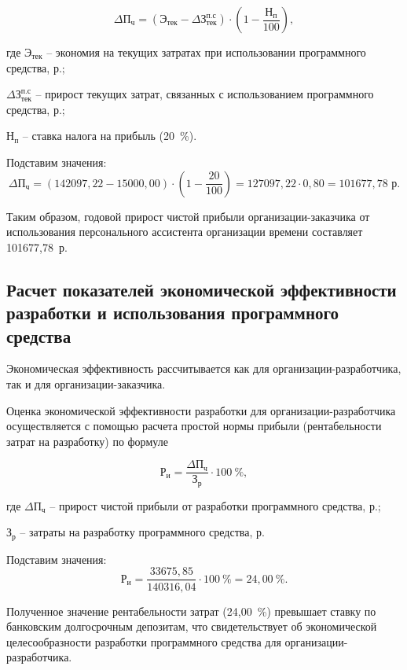 \begin{equation}
    \Delta\text{П}_{\text{ч}} = (\text{Э}_{\text{тек}} - \Delta\text{З}_{\text{тек}}^{\text{п.с}}) \cdot \left(1 - \frac{\text{Н}_{\text{п}}}{100}\right),
\end{equation}

где $\text{Э}_{\text{тек}}$ -- экономия на текущих затратах при использовании программного средства, р.;

    $\Delta\text{З}_{\text{тек}}^{\text{п.с}}$ -- прирост текущих затрат, связанных с использованием программного средства, р.;

    $\text{Н}_{\text{п}}$ -- ставка налога на прибыль (20~\%).

Подставим значения:
$$
    \Delta\text{П}_{\text{ч}} = (142097{,}22 - 15000{,}00) \cdot \left(1 - \frac{20}{100}\right) = 127097{,}22 \cdot 0{,}80 = 101677{,}78 \text{ р}.
$$

Таким образом, годовой прирост чистой прибыли организации-заказчика от использования персонального ассистента организации времени составляет 101677{,}78~р.

\subsection{Расчет показателей экономической эффективности разработки и использования программного средства}

Экономическая эффективность рассчитывается как для организации-разработчика, так и для организации-заказчика.

\numberedparagraph
Оценка экономической эффективности разработки для организации-разработчика осуществляется с помощью расчета простой нормы прибыли (рентабельности затрат на разработку) по формуле

\begin{equation}
    \text{Р}_{\text{и}} = \frac{\Delta\text{П}_{\text{ч}}}{\text{З}_{\text{р}}} \cdot 100~\%,
\end{equation}

где $\Delta\text{П}_{\text{ч}}$ -- прирост чистой прибыли от разработки программного средства, р.;

    $\text{З}_{\text{р}}$ -- затраты на разработку программного средства, р.

Подставим значения:
$$
    \text{Р}_{\text{и}} = \frac{33675{,}85}{140316{,}04} \cdot 100~\% = 24{,}00~\%.
$$

Полученное значение рентабельности затрат (24{,}00~\%) превышает ставку по банковским долгосрочным депозитам, что свидетельствует об экономической целесообразности разработки программного средства для организации-разработчика.

